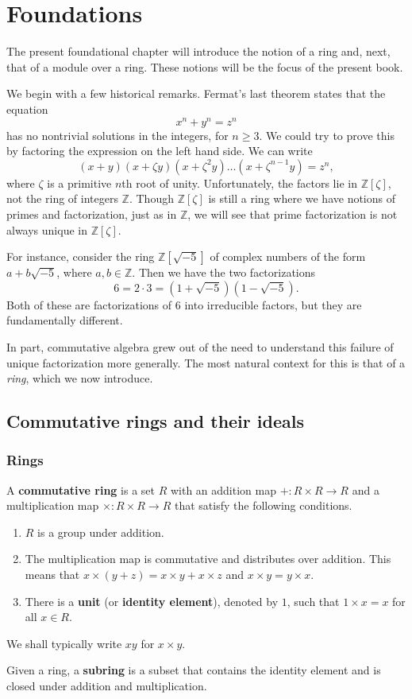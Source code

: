 \chapter{Foundations}
\label{foundations}


The present foundational chapter will introduce the notion of a ring and,
next, that of  a module over a ring. These notions will be the focus of the
present book.

We begin with a few historical remarks.  Fermat's last theorem states that the
equation
  \[ \label{ft} x^n  + y^n = z^n \]
has no nontrivial solutions in the integers, for $n \ge 3$.  We could try to
prove this by factoring the expression on the left hand side. We can write
  \[ (x+y)(x+ \zeta y) (x+ \zeta^2y) \dots (x+ \zeta^{n-1}y) = z^n, \]
where $\zeta$ is a primitive $n$th root of unity.  Unfortunately, the factors
lie in $\mathbb{Z}[\zeta]$, not the ring of integers $\mathbb{Z}$.  Though
$\mathbb{Z}[\zeta]$ is still a ring where we have notions of primes and
factorization, just as in $\mathbb{Z}$, we will see that prime factorization
is not always unique in $\mathbb{Z}[\zeta]$.

For instance, consider the ring
$\mathbb{Z}[\sqrt{-5}]$ of complex numbers of the form $a + b\sqrt{-5}$, where
$a, b \in \mathbb{Z}$.  Then we have the two factorizations
  \[ 6 = 2 \cdot 3 = (1 + \sqrt{-5})(1 - \sqrt{-5}). \]
Both of these are factorizations of 6 into irreducible factors, but they
are fundamentally different.

In part, commutative algebra grew out of the need to understand this failure
of unique factorization more generally.
The most natural context for this is that of a \emph{ring}, which we now
introduce. 

\section{Commutative rings and their ideals}

\subsection{Rings}
\begin{definition} 
A \textbf{commutative ring} is a set $R$ with an addition map
$+ : R \times R \to R$ and a multiplication map $\times : R \times R \to R$
that satisfy the following conditions.

\begin{enumerate}
  \item $R$ is a group under addition.
  \item The multiplication map is commutative and distributes over addition.
  This means that $x \times (y+z) = x \times y + x\times z$ and $x \times y = y
  \times x$.
  \item There is a \textbf{unit} (or \textbf{identity element}), denoted by
        $1$, such that $1 \times x = x$ for all $x \in R$.
\end{enumerate}
We shall typically write $xy$ for $x \times y$.

Given a ring, a \textbf{subring} is a subset that contains the identity
element and is closed under addition and multiplication.
\end{definition} 


